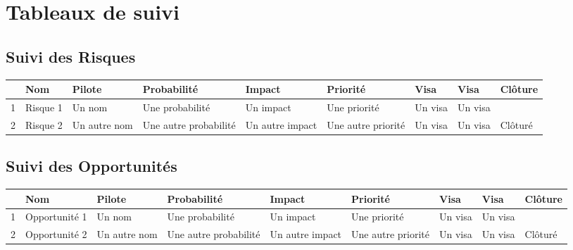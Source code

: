 
\section*{Tableaux de suivi}

\subsection*{Suivi des Risques}
\begin{longtable}{|p{0.3cm}|p{2.5cm}|p{2cm}|p{2cm}|p{1.8cm}|p{1.5cm}|p{1cm}|p{1cm}|p{1.5cm}|}
			\hline
			\rowcolor{gray!40}
			\No & Nom & Pilote & Probabilité & Impact & Priorité & Visa \RQCourt{} & Visa \CPCourt{} & Clôture \\\hline
			
			 1 & Risque 1 & Un nom & Une probabilité & Un impact & Une priorité & Un visa & Un visa & \\\hline
			 
			 2 & Risque 2 & Un autre nom & Une autre probabilité & Un autre impact & Une autre priorité & Un visa & Un visa & Clôturé \\\hline
			 
			 
\end{longtable}

\subsection*{Suivi des Opportunités}

\begin{longtable}{|p{0.3cm}|p{2.5cm}|p{2cm}|p{2cm}|p{1.8cm}|p{1.5cm}|p{1cm}|p{1cm}|p{1.5cm}|}
			\hline
			\rowcolor{gray!40}
			\No & Nom & Pilote & Probabilité & Impact & Priorité & Visa \RQCourt{} & Visa \CPCourt{} & Clôture \\\hline
			 
			 1 & Opportunité 1 & Un nom & Une probabilité & Un impact & Une priorité & Un visa & Un visa & \\\hline
			 
			 2 & Opportunité 2 & Un autre nom & Une autre probabilité & Un autre impact & Une autre priorité & Un visa & Un visa & Clôturé \\\hline
			 			 
\end{longtable}